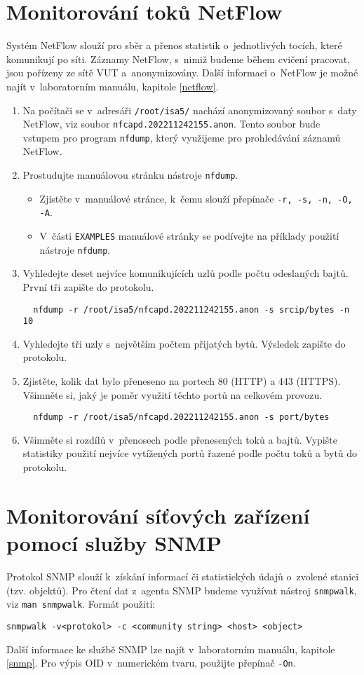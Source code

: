 \documentclass[a4paper,11pt]{article}
\begin{document}
\section{Monitorování toků NetFlow}
Systém NetFlow slouží pro sběr a přenos statistik o~jednotlivých tocích, které komunikují po síti. Záznamy NetFlow, s~nimiž budeme během cvičení pracovat, jsou pořízeny ze sítě VUT a~anonymizovány. Další informaci o~NetFlow je možné najít v~laboratorním manuálu, kapitole \ref{netflow}.
\begin{enumerate}
  \item Na počítači se v~adresáři {\tt /root/isa5/} nachází anonymizovaný soubor s~daty NetFlow, viz soubor \texttt{nfcapd.202211242155.anon}. Tento soubor bude vstupem pro program  {\tt nfdump}, který využijeme pro prohledávání záznamů NetFlow.
  \item Prostudujte manuálovou stránku nástroje {\tt nfdump}.
    \begin{itemize}
      \item Zjistěte v~manuálové stránce, k~čemu slouží přepínače {\tt -r, -s, -n, -O, -A}.
      \item V~části {\tt EXAMPLES} manuálové stránky se podívejte na příklady použití nástroje {\tt nfdump}.
    \end{itemize}
  \item Vyhledejte deset nejvíce komunikujících uzlů podle počtu odeslaných bajtů. První tři zapište do protokolu.
\begin{verbatim}
  nfdump -r /root/isa5/nfcapd.202211242155.anon -s srcip/bytes -n 10
\end{verbatim}
  \item Vyhledejte tři uzly s~největším počtem přijatých bytů. Výsledek zapište do protokolu.
  \item Zjistěte, kolik dat bylo přeneseno na portech 80 (HTTP) a 443 (HTTPS). Všimněte si, jaký je poměr využití těchto portů na celkovém provozu.
\begin{verbatim}
  nfdump -r /root/isa5/nfcapd.202211242155.anon -s port/bytes
\end{verbatim}
  \item Všimněte si rozdílů v~přenosech podle přenesených toků a bajtů. Vypište statistiky použití nejvíce vytížených portů řazené podle počtu toků a bytů do protokolu.
\end{enumerate}

\section{Monitorování síťových zařízení pomocí služby SNMP}
Protokol SNMP slouží k~získání informací či statistických údajů o~zvolené stanici (tzv. objektů). Pro čtení dat z~agenta SNMP budeme využívat nástroj \texttt{snmpwalk}, viz \texttt{man snmpwalk}. Formát použití:
\begin{verbatim}
snmpwalk -v<protokol> -c <community string> <host> <object>
\end{verbatim}
Další informace ke službě SNMP lze najít v~laboratorním manuálu, kapitole \ref{snmp}. Pro výpis OID v~numerickém tvaru, použijte přepínač \verb|-On|.
\end{document}
